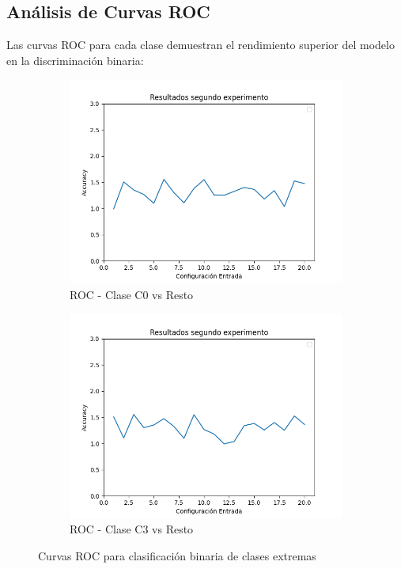 \subsection{Análisis de Curvas ROC}

Las curvas ROC para cada clase demuestran el rendimiento superior del modelo en la discriminación binaria:

\begin{figure}[h!]
\centering
\begin{subfigure}[b]{0.48\textwidth}
    \includegraphics[width=\textwidth]{images/resultThirdEval.png}
    \caption{ROC - Clase C0 vs Resto}
    \label{fig:roc_c0}
\end{subfigure}
\hfill
\begin{subfigure}[b]{0.48\textwidth}
    \includegraphics[width=\textwidth]{images/resultFourthEval.png}
    \caption{ROC - Clase C3 vs Resto}
    \label{fig:roc_c3}
\end{subfigure}
\caption{Curvas ROC para clasificación binaria de clases extremas}
\label{fig:roc_curves}
\end{figure}

